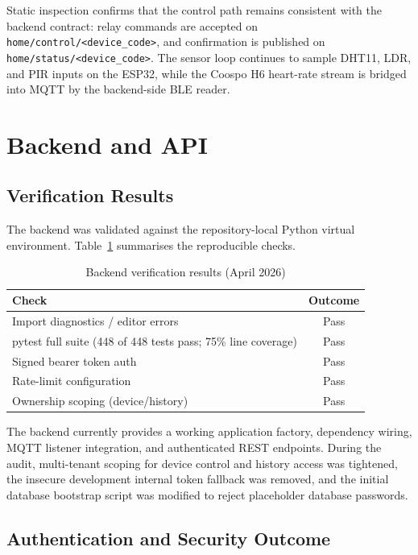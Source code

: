 Static inspection confirms that the control path remains consistent with the
backend contract: relay commands are accepted on
\texttt{home/control/<device\_code>}, and confirmation is published on
\texttt{home/status/<device\_code>}. The sensor loop continues to sample DHT11,
LDR, and PIR inputs on the ESP32, while the Coospo H6 heart-rate stream is
bridged into MQTT by the backend-side BLE reader.

\section{Backend and API}

\subsection{Verification Results}

The backend was validated against the repository-local Python virtual environment. Table~\ref{tab:backend_verify} summarises the reproducible checks.

\begin{table}[ht]
\centering
\caption{Backend verification results (April 2026)}
\label{tab:backend_verify}
\begin{tabular}{lc}
\toprule
\textbf{Check} & \textbf{Outcome} \\
\midrule
Import diagnostics / editor errors & Pass \\
pytest full suite (448 of 448 tests pass; 75\% line coverage) & Pass \\
Signed bearer token auth & Pass \\
Rate-limit configuration & Pass \\
Ownership scoping (device/history) & Pass \\
\bottomrule
\end{tabular}
\end{table}

The backend currently provides a working application factory, dependency wiring,
MQTT listener integration, and authenticated REST endpoints. During the audit,
multi-tenant scoping for device control and history access was tightened, the
insecure development internal token fallback was removed, and the initial database
bootstrap script was modified to reject placeholder database passwords.

\subsection{Authentication and Security Outcome}

